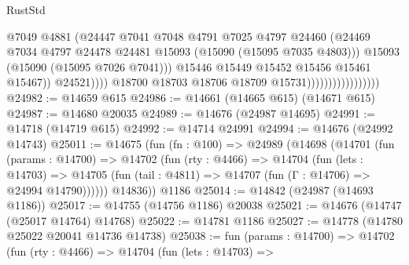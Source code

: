 \begin{lexlean}{RustStd}
\begin{coremodule}
                                                  @7049
                                                  @4881
                                                  (@24447
                                                    @7041
                                                    @7048
                                                    @4791
                                                    @7025
                                                    @4797
                                                    @24460
                                                    (@24469
                                                      @7034
                                                      @4797
                                                      @24478
                                                      @24481
                                                      @15093
                                                      (@15090 (@15095 @7035 @4803)))
                                                    @15093
                                                    (@15090 (@15095 @7026 @7041)))
                                                  @15446
                                                  @15449
                                                  @15452
                                                  @15456
                                                  @15461
                                                  @15467))
                                              @24521))))
                                      @18700
                                      @18703
                                      @18706
                                      @18709
                                      @15731)))))))))))))))))
@24982 := @14659 @615
@24986 := @14661 (@14665 @615) (@14671 @615)
@24987 := @14680 @20035
@24989 := @14676 (@24987 @14695)
@24991 := @14718 (@14719 @615)
@24992 := @14714 @24991
@24994 := @14676 (@24992 @14743)
@25011 := @14675
    (fun (fn : @100) =>
    @24989
      (@14698
        (@14701
          (fun (params : @14700) =>
          @14702
            (fun (rty : @4466) =>
            @14704
              (fun (lets : @14703) =>
              @14705 (fun (tail : @4811) => @14707 (fun (Γ : @14706) => @24994 @14790))))))
        @14836))
    @1186
@25014 := @14842 (@24987 (@14693 @1186))
@25017 := @14755 (@14756 @1186) @20038
@25021 := @14676 (@14747 (@25017 @14764) @14768)
@25022 := @14781 @1186
@25027 := @14778 (@14780 @25022 @20041 @14736 @14738)
@25038 := fun (params : @14700) =>
  @14702
    (fun (rty : @4466) =>
    @14704
      (fun (lets : @14703) =>

\end{coremodule}
\end{lexlean}
